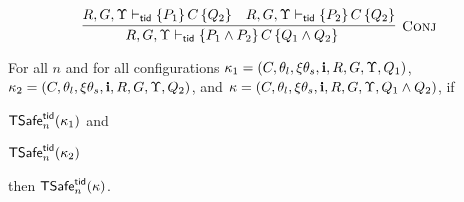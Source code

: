 \[
\infer[\textsc{Conj}]{
R,G, \Upsilon \tvdash  \{P_1 \land P_2\}\,C\,\{Q_1 \land Q_2\} \quad
}{
R,G, \Upsilon \tvdash  \{P_1\}\,C\,\{Q_2\}
\quad
R,G, \Upsilon \tvdash \{P_2\}\,C\,\{Q_2\}
}
\]

\begin{lemma}[Conj]\label{lem:conj}
For all $n$ and for all 
configurations 
$\kappa_1=(C,\theta_l,\xi\theta_s,{\bf i},R,G,\Upsilon, Q_1)$,
$\kappa_2=(C,\theta_l,\xi\theta_s,{\bf i},R,G,\Upsilon, Q_2)$, and
$\kappa=(C,\theta_l,\xi\theta_s,{\bf i},R,G,\Upsilon, Q_1 \land Q_2)$,
if 
\begin{inparaenum}[(i)]
\item ${\sf TSafe}^{{\sf tid}}_n(\kappa_1)$ and %
\item ${\sf TSafe}^{{\sf tid}}_n(\kappa_2)$ %
\end{inparaenum}
then
${\sf TSafe}^{{\sf tid}}_n(\kappa)$.
\end{lemma}

